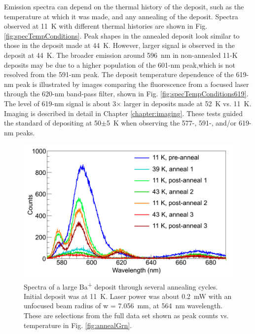 Emission spectra can depend on the thermal history of the deposit, such as the temperature at which it was made, and any annealing of the deposit.  Spectra observed at 11~K with different thermal histories are shown in Fig. \ref{fig:specTempConditions}.  Peak shapes in the annealed deposit look similar to those in the deposit made at 44~K.  However, larger signal is observed in the deposit at 44~K.  The broader emission around 596~nm in non-annealed 11-K deposits may be due to a higher population of the 601-nm peak,which is not resolved from the 591-nm peak.  The deposit temperature dependence of the 619-nm peak is illustrated by images comparing the fluorescence from a focused laser through the 620-nm band-pass filter, shown in Fig. \ref{fig:specTempConditions619}.  The level of 619-nm signal is about 3$\times$ larger in deposits made at 52~K vs. 11~K.  Imaging is described in detail in Chapter \ref{chapter:imaging}.  These tests guided the standard of depositing at 50$\pm$5~K when observing the 577-, 591-, and/or 619-nm peaks.







\begin{figure} %
        \centering
                \includegraphics[width=.7\textwidth]{figures/spectra_annealing.png}
                \caption{Spectra of a large Ba\textsuperscript{+} deposit through several annealing cycles.  Initial deposit was at 11~K.  Laser power was about 0.2~mW with an unfocused beam radius of w = 7.056~mm, at 564~nm wavelength.  These are selections from the full data set shown as peak counts vs. temperature in Fig. \ref{fig:annealGrn}.  \cite{Mong2015}}
\label{fig:specAnneal}
\end{figure}

